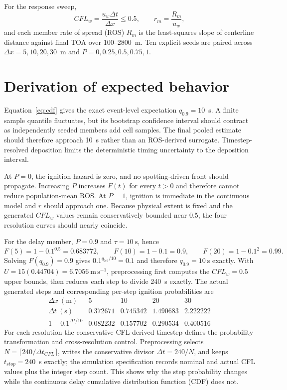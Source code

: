 For the response sweep,
\begin{equation}
 CFL_w=\frac{u_w\Delta t}{\Delta x}\leq0.5,
 \qquad r_m=\frac{R_m}{u_w},
 \label{eq:ros}
\end{equation}
and each member rate of spread (ROS) $R_m$ is the least-squares slope of centerline distance
against final TOA over 100--2800~m. Ten explicit seeds are paired across
$\Delta x=5,10,20,30$~m and $P=0,0.25,0.5,0.75,1$.

\section{Derivation of expected behavior}
Equation~\ref{eq:cdf} gives the exact event-level expectation
$q_{0.9}=10$~s. A finite sample quantile fluctuates, but its bootstrap confidence
interval should contract as independently seeded members add cell samples. The
final pooled estimate should therefore approach 10~s rather than an ROS-derived
surrogate. Timestep-resolved deposition limits the deterministic timing
uncertainty to the deposition interval.

At $P=0$, the ignition hazard is zero, and no spotting-driven front should
propagate. Increasing $P$ increases $F(t)$ for every $t>0$ and therefore cannot
reduce population-mean ROS. At $P=1$, ignition is immediate in the continuous
model and $\overline r$ should approach one. Because physical extent is fixed and the generated
$CFL_w$ values remain conservatively bounded near 0.5, the four resolution curves should nearly coincide.

For the delay member, \(P=0.9\) and \(\tau=10~\mathrm{s}\), hence
\[
 F(5)=1-0.1^{0.5}=0.683772,\qquad
 F(10)=1-0.1=0.9,\qquad
 F(20)=1-0.1^2=0.99.
\]
Solving \(F(q_{0.9})=0.9\) gives
\(0.1^{q_{0.9}/10}=0.1\) and therefore
\(q_{0.9}=10~\mathrm{s}\) exactly.  With
\(U=15(0.44704)=6.7056~\mathrm{m\,s^{-1}}\), preprocessing first computes
the \(CFL_w=0.5\) upper bounds, then reduces each step to divide 240~s
exactly.  The actual generated steps and corresponding per-step ignition
probabilities are
\[
\begin{array}{c|rrrr}
\Delta x~(\mathrm{m})&5&10&20&30\\\hline
\Delta t~(\mathrm{s})&0.372671&0.745342&1.490683&2.222222\\
1-0.1^{\Delta t/10}&0.082232&0.157702&0.290534&0.400516
\end{array}
\]
For each resolution the conservative CFL-derived timestep defines the probability transformation and cross-resolution control. Preprocessing selects \(N=\lceil240/\Delta t_{CFL}\rceil\), writes the conservative divisor \(\Delta t=240/N\), and keeps \(t_{stop}=240\)~s exactly; the simulation specification records nominal and actual CFL values plus the integer step count. This shows why the step probability changes while the continuous delay cumulative distribution function (CDF)
does not.


